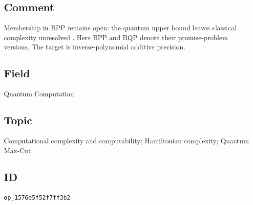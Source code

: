 \subsection*{Comment}

Membership in $\mathrm{BPP}$ remains open: the quantum upper bound
leaves classical complexity unresolved .
Here $\mathrm{BPP}$ and $\mathrm{BQP}$ denote their promise-problem
versions. The target is inverse-polynomial additive precision.

\subsection*{Field}

Quantum Computation

\subsection*{Topic}

Computational complexity and computability; Hamiltonian complexity; Quantum Max-Cut

\subsection*{ID}

\texttt{op\_1576e5f52f7ff3b2}
